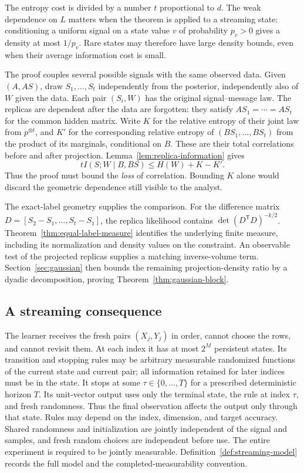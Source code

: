 The entropy cost is divided by a number $t$ proportional to $d$.
The weak dependence on $L$ matters when the theorem is applied to a
streaming state: conditioning a uniform signal on a state value $v$ of
probability $p_v>0$ gives a density at most $1/p_v$. Rare states may
therefore have large density bounds, even when their average information
cost is small.

The proof couples several possible signals with the same observed data.
Given $(A,AS)$, draw $S_1,\ldots,S_t$ independently from the posterior,
independently also of $W$ given the data. Each pair $(S_i,W)$ has the
original signal--message law. The replicas are dependent after the data
are forgotten: they satisfy $AS_1=\cdots=AS_t$ for the common hidden
matrix. Write $K$ for the relative entropy of their joint law from
$p^{\otimes t}$, and $K'$ for the corresponding relative entropy of
$(BS_1,\ldots,BS_t)$ from the product of its marginals, conditional on
$B$. These are their total correlations before and after projection.
Lemma~\ref{lem:replica-information} gives
\[
 tI(S;W\mid B,BS)\le H(W)+K-K'.
\]
Thus the proof must bound the \emph{loss} of correlation. Bounding $K$
alone would discard the geometric dependence still visible to the analyst.

The exact-label geometry supplies the comparison. For the difference
matrix $D=[S_2-S_1,\ldots,S_t-S_1]$, the replica likelihood contains
$\det(D^{\mathsf T}D)^{-k/2}$.
Theorem~\ref{thm:equal-label-measure} identifies the underlying finite
measure, including its normalization and density values on the constraint.
An observable test of the projected replicas supplies a matching
inverse-volume term.
Section~\ref{sec:gaussian} then bounds the remaining projection-density
ratio by a dyadic decomposition, proving Theorem~\ref{thm:gaussian-block}.

\subsection*{A streaming consequence}

The learner receives the fresh pairs $(X_j,Y_j)$ in order, cannot choose
the rows, and cannot revisit them. At each index it has at most $2^M$
persistent states. Its transition and stopping rules may be arbitrary
measurable randomized functions of the current state and current pair;
all information retained for later indices must be in the state.
It stops at some $\tau\in\{0,\ldots,T\}$ for a prescribed deterministic
horizon $T$. Its unit-vector output uses only the terminal state, the rule
at index $\tau$, and fresh randomness. Thus the final observation affects
the output only through that state. Rules may depend on the index, dimension,
and target accuracy. Shared randomness and initialization are jointly
independent of the signal and samples, and fresh random choices are
independent before use. The entire experiment is required to be jointly
measurable. Definition~\ref{def:streaming-model} records the full model and
the completed-measurability convention.

